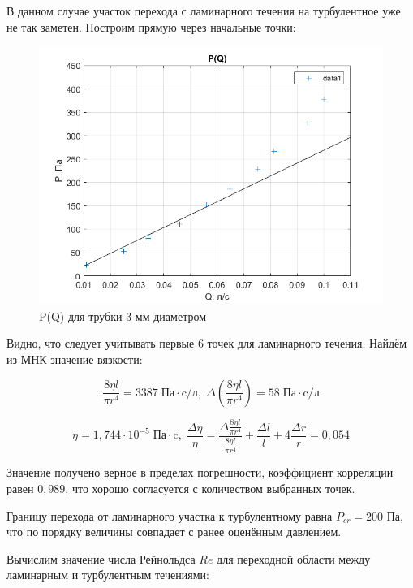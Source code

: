 \documentclass[a4paper, 12pt]{article} %
\begin{document}
В данном случае участок перехода с ламинарного течения на турбулентное уже не так заметен. Построим прямую через начальные точки: 

\begin{figure}[!h]
    \centering
    \includegraphics[width = 12 cm]{3mm2}
    \caption{P(Q) для трубки 3 мм диаметром}
    \label{fig:vac}
\end{figure}

Видно, что следует учитывать первые 6 точек для ламинарного течения. Найдём из МНК значение вязкости:

\begin{equation}
	\frac{8\eta l}{\pi r^4} = 3387 \; \text{Па} \cdot \text{c/л}, \; \Delta \left( \frac{8\eta l}{\pi r^4} \right) = 58 \; \text{Па} \cdot \text{c/л}
\end{equation}

\begin{equation}
	\eta = 1,744 \cdot 10^{-5} \; \text{Па} \cdot \text{c}, \; \frac{\Delta \eta}{\eta} = \frac{\Delta \frac{8\eta l}{\pi r^4}}{\frac{8\eta l}{\pi r^4}} +  \frac{\Delta l}{l} + 4 \frac{\Delta r}{r} = 0,054
\end{equation}

Значение получено верное в пределах погрешности, коэффициент корреляции равен $0,989$, что хорошо согласуется с количеством выбранных точек.

Границу перехода от ламинарного участка к турбулентному равна $P_{cr} = 200$ Па, что по порядку величины совпадает с ранее оценённым давлением.

Вычислим значение числа Рейнольдса $Re$ для переходной области между ламинарным и турбулентным течениями:
\end{document}
